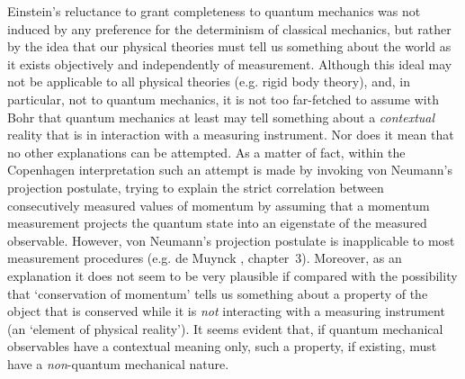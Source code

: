 \documentclass[12pt]{article}
\begin{document}
Einstein's reluctance to grant completeness to quantum mechanics
was not induced by any preference for the determinism of classical
mechanics, but rather by the idea that our physical theories must
tell us something about the world as it exists objectively and
independently of measurement. Although this ideal may not be
applicable to all physical theories (e.g. rigid body theory), and,
in particular, not to quantum mechanics, it is not too far-fetched
to assume with Bohr that quantum mechanics at least may tell
something about a {\em contextual} reality that is in interaction
with a measuring instrument.
Nor does it mean that no other explanations can be attempted. As a
matter of fact, within the Copenhagen interpretation such an
attempt is made by invoking von Neumann's projection postulate,
trying to explain the strict correlation between consecutively
measured values of momentum by assuming that a momentum
measurement projects the quantum state into an eigenstate of the
measured observable. However, von Neumann's projection postulate
is inapplicable to most measurement procedures (e.g. de Muynck
\cite{dM2002}, chapter~3). Moreover, as an explanation it does not
seem to be very plausible if compared with the possibility that
`conservation of momentum' tells us something about a property of
the object that is conserved while it is {\em not} interacting
with a measuring instrument (an `element of physical reality'). It
seems evident that, if quantum mechanical observables have a
contextual meaning only, such a property, if existing, must have a
{\em non}-quantum mechanical nature.
\end{document}
